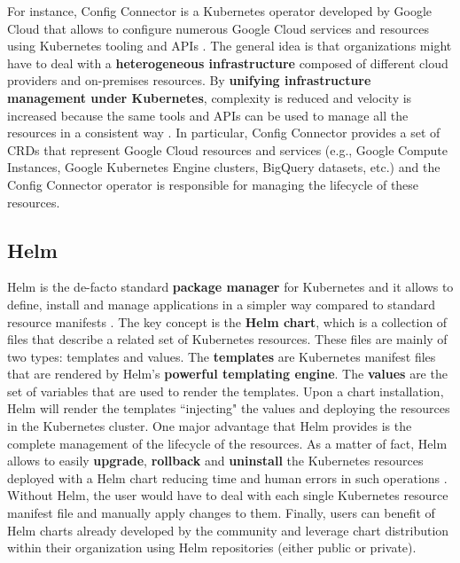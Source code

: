 For instance, Config Connector is a Kubernetes operator developed by Google Cloud that allows to configure numerous Google Cloud services and resources using Kubernetes tooling and APIs \cite{gcp_config_connector}.
The general idea is that organizations might have to deal with a \textbf{heterogeneous infrastructure} composed of different cloud providers and on-premises resources. 
By \textbf{unifying infrastructure management under Kubernetes}, complexity is reduced and velocity is increased because the same tools and APIs can be used to manage all the resources in a consistent way \cite{gcp_config_connector}.
In particular, Config Connector provides a set of CRDs that represent Google Cloud resources and services (e.g., Google Compute Instances, Google Kubernetes Engine clusters, BigQuery datasets, etc.) and the Config Connector operator is responsible for managing the lifecycle of these resources.


\subsection{Helm}

Helm is the de-facto standard \textbf{package manager} for Kubernetes and it allows to define, install and manage applications in a simpler way compared to standard resource manifests \cite{helm}.
The key concept is the \textbf{Helm chart}, which is a collection of files that describe a related set of Kubernetes resources. 
These files are mainly of two types: templates and values.
The \textbf{templates} are Kubernetes manifest files that are rendered by Helm's \textbf{powerful templating engine}. 
The \textbf{values} are the set of variables that are used to render the templates.
Upon a chart installation, Helm will render the templates ``injecting" the values and deploying the resources in the Kubernetes cluster. 
One major advantage that Helm provides is the complete management of the lifecycle of the resources.
As a matter of fact, Helm allows to easily \textbf{upgrade}, \textbf{rollback} and \textbf{uninstall} the Kubernetes resources deployed with a Helm chart reducing time and human errors in such operations \cite{helm}. 
Without Helm, the user would have to deal with each single Kubernetes resource manifest file and manually apply changes to them.
Finally, users can benefit of Helm charts already developed by the community and leverage chart distribution within their organization using Helm repositories (either public or private).

